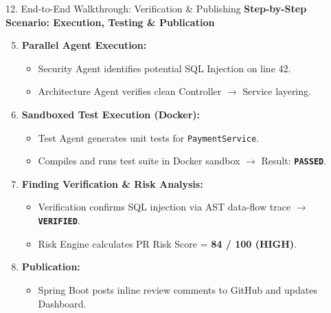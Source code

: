 \documentclass[aspectratio=169,11pt]{beamer}
\begin{document}
\begin{frame}{12. End-to-End Walkthrough: Verification \& Publishing}
  \textbf{Step-by-Step Scenario: Execution, Testing \& Publication}
  \vspace{0.25cm}
  \begin{enumerate}
    \setcounter{enumi}{4}
    \item \textbf{Parallel Agent Execution:}
      \begin{itemize}
        \item Security Agent identifies potential SQL Injection on line 42.
        \item Architecture Agent verifies clean Controller $\rightarrow$ Service layering.
      \end{itemize}
    \vspace{0.15cm}
    \item \textbf{Sandboxed Test Execution (Docker):}
      \begin{itemize}
        \item Test Agent generates unit tests for \texttt{PaymentService}.
        \item Compiles and runs test suite in Docker sandbox $\rightarrow$ Result: \textbf{\texttt{\small PASSED}}.
      \end{itemize}
    \vspace{0.15cm}
    \item \textbf{Finding Verification \& Risk Analysis:}
      \begin{itemize}
        \item Verification confirms SQL injection via AST data-flow trace $\rightarrow$ \textbf{\texttt{\small VERIFIED}}.
        \item Risk Engine calculates PR Risk Score = \textbf{84 / 100 (HIGH)}.
      \end{itemize}
    \vspace{0.15cm}
    \item \textbf{Publication:}
      \begin{itemize}
        \item Spring Boot posts inline review comments to GitHub and updates Dashboard.
      \end{itemize}
  \end{enumerate}
\end{frame}
\end{document}
